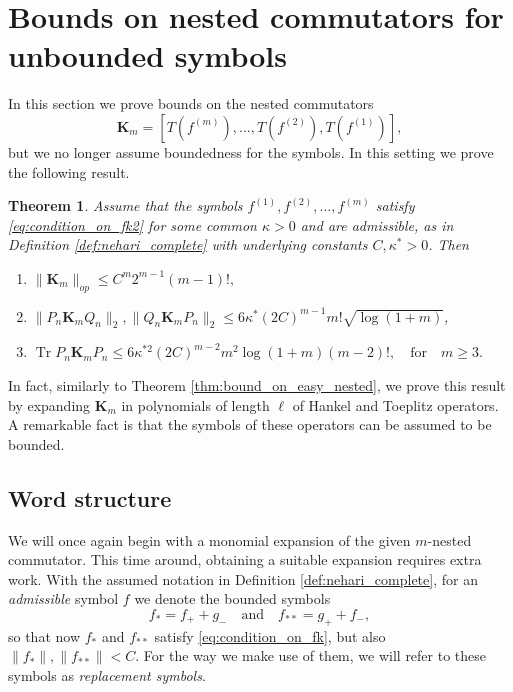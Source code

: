 \documentclass[11pt]{amsart}
\theoremstyle{plain}
\newtheorem{theorem}{Theorem}[section]
\theoremstyle{remark}
\DeclareMathOperator{\Tr}{Tr}
\numberwithin{equation}{section}
\begin{document}
\section{Bounds on nested commutators for unbounded symbols}\label{sec:unbounded_bounds}
In this section we prove bounds on the nested commutators
$$
    \mathbf{K}_m=[T(f^{(m)}),\ldots, T(f^{(2)}), T(f^{(1)})],
$$
but we no longer assume boundedness for the symbols. In this setting we prove the following result.

\begin{theorem}\label{thm:bound_on_difficult_nested}
Assume that the symbols $f^{(1)},f^{(2)},\ldots, f^{(m)}$ satisfy \eqref{eq:condition_on_fk2} for some common $\kappa>0$ and
are admissible, as in Definition \ref{def:nehari_complete} with underlying constants $C, \kappa^*>0$. 
%
%
%
Then
\begin{enumerate}
\item $\|\mathbf{K}_m\|_{op}\leq 
%
C^m 2^{m-1}(m-1)!,
$
\item $\|P_n\mathbf{K}_mQ_n\|_{2}, \|Q_n\mathbf{K}_mP_n\|_{2}\leq  6\kappa^* (2C)^{m-1} m! \sqrt{\log(1+m)}$,
\item $\Tr  P_n \mathbf{K}_m P_n \leq 
6 \kappa^{*2}  (2C)^{m-2} m^2\log(1+m)(m-2)!,
\quad\text{for}\quad m\geq 3.$
\end{enumerate}
\end{theorem}

In fact, similarly to Theorem \ref{thm:bound_on_easy_nested}, we prove this result by expanding $\mathbf{K}_m$ in polynomials of length $\ell$ of Hankel and Toeplitz operators. A remarkable fact is that the symbols of these operators can be assumed to be bounded. 

\subsection{Word structure}\label{sec:word_structure}
We will once again begin with a monomial expansion of the given $m$-nested commutator. This time around, obtaining a suitable expansion requires extra work. 
With the assumed notation in Definition \ref{def:nehari_complete}, for an \textit{admissible} symbol $f$ we denote the bounded symbols
$$f_*=f_++g_-\quad \text{and}\quad f_{**}=g_++f_-,$$
so that now $f_*$ and $f_{**}$ satisfy \eqref{eq:condition_on_fk}, but also $\|f_*\|, \|f_{**}\|<C$. For the way we make use of them, we will refer to these symbols as \textit{replacement symbols}.
\end{document}
